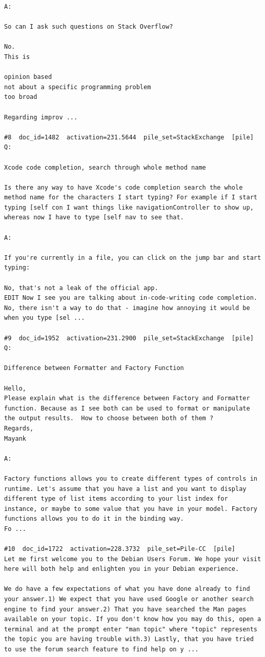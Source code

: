 \begin{verbatim}
A:

So can I ask such questions on Stack Overflow?

No.
This is

opinion based 
not about a specific programming problem 
too broad

Regarding improv ...

#8  doc_id=1482  activation=231.5644  pile_set=StackExchange  [pile]
Q:

Xcode code completion, search through whole method name

Is there any way to have Xcode's code completion search the whole method name for the characters I start typing? For example if I start typing [self con I want things like navigationController to show up, whereas now I have to type [self nav to see that.

A:

If you're currently in a file, you can click on the jump bar and start typing:

No, that's not a leak of the official app.
EDIT Now I see you are talking about in-code-writing code completion. No, there isn't a way to do that - imagine how annoying it would be when you type [sel ...

#9  doc_id=1952  activation=231.2900  pile_set=StackExchange  [pile]
Q:

Difference between Formatter and Factory Function

​Hello,
Please explain what is the difference between Factory and Formatter function. Because as I see both can be used to format or manipulate the output results.  How to choose between both of them ?
Regards,
Mayank

A:

Factory functions allows you to create different types of controls in runtime. Let's assume that you have a list and you want to display different type of list items according to your list index for instance, or maybe to some value that you have in your model. Factory functions allows you to do it in the binding way. 
Fo ...

#10  doc_id=1722  activation=228.3732  pile_set=Pile-CC  [pile]
Let me first welcome you to the Debian Users Forum. We hope your visit here will both help and enlighten you in your Debian experience.

We do have a few expectations of what you have done already to find your answer.1) We expect that you have used Google or another search engine to find your answer.2) That you have searched the Man pages available on your topic. If you don't know how you may do this, open a terminal and at the prompt enter "man topic" where "topic" represents the topic you are having trouble with.3) Lastly, that you have tried to use the forum search feature to find help on y ...

\end{verbatim}


